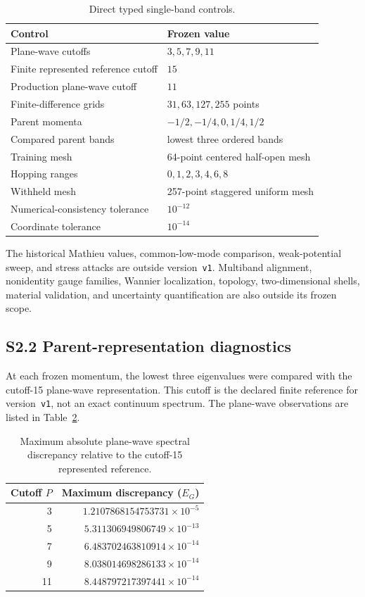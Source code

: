 \begin{table}[ht]
\centering
\caption{Direct typed single-band controls.}
\label{tab:supp-m1-controls}
\begin{tabular}{@{}ll@{}}
\toprule
Control & Frozen value \\
\midrule
Plane-wave cutoffs & $3,5,7,9,11$ \\
Finite represented reference cutoff & $15$ \\
Production plane-wave cutoff & $11$ \\
Finite-difference grids & $31,63,127,255$ points \\
Parent momenta & $-1/2,-1/4,0,1/4,1/2$ \\
Compared parent bands & lowest three ordered bands \\
Training mesh & 64-point centered half-open mesh \\
Hopping ranges & $0,1,2,3,4,6,8$ \\
Withheld mesh & 257-point staggered uniform mesh \\
Numerical-consistency tolerance & $10^{-12}$ \\
Coordinate tolerance & $10^{-14}$ \\
\bottomrule
\end{tabular}
\end{table}

The historical Mathieu values, common-low-mode comparison, weak-potential
sweep, and stress attacks are outside version~\texttt{v1}. Multiband alignment, nonidentity gauge
families, Wannier localization, topology, two-dimensional shells, material
validation, and uncertainty quantification are also outside its frozen scope.

\subsection*{S2.2 Parent-representation diagnostics}

At each frozen momentum, the lowest three eigenvalues were compared with the
cutoff-15 plane-wave representation. This cutoff is the declared finite
reference for version~\texttt{v1}, not an exact continuum spectrum. The plane-wave observations
are listed in Table~\ref{tab:supp-m1-plane-wave}.

\begin{table}[ht]
\centering
\caption{Maximum absolute plane-wave spectral discrepancy relative to the
cutoff-15 represented reference.}
\label{tab:supp-m1-plane-wave}
\begin{tabular}{@{}rr@{}}
\toprule
Cutoff $P$ & Maximum discrepancy ($E_G$) \\
\midrule
3  & $1.2107868154753731\times10^{-5}$ \\
5  & $5.311306949806749\times10^{-13}$ \\
7  & $6.483702463810914\times10^{-14}$ \\
9  & $8.038014698286133\times10^{-14}$ \\
11 & $8.448797217397441\times10^{-14}$ \\
\bottomrule
\end{tabular}
\end{table}

